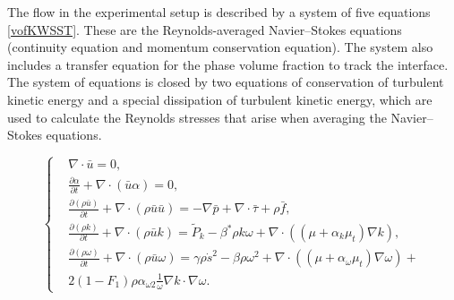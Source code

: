 \documentclass[mathematics,article,accept,pdftex,moreauthors]{Definitions/mdpi}
\begin{document}
The flow in the experimental setup is described by a system of five equations \eqref{vofKWSST}. These are the Reynolds-averaged Navier--Stokes equations (continuity equation and momentum conservation equation). The system also includes a transfer equation for the phase volume fraction to track the interface. The system of equations is closed by two equations of conservation of turbulent kinetic energy and a special dissipation of turbulent kinetic energy, which are used to calculate the Reynolds stresses that arise when averaging the Navier--Stokes equations.
\begin{linenomath} 
\begin{equation}
	\label{vofKWSST}
	\left\{
		\begin{aligned}
			&{\nabla} \cdot \bar{{u}} = 0,\\
			&\frac{\partial \alpha}{\partial t} + {\nabla} \cdot (\bar{{u}} \alpha) = 0,\\
			&\frac{\partial (\rho \bar{{u}})}{\partial t} + {\nabla} \cdot (\rho \bar{{u}} \bar{{u}}) = -{\nabla} \bar{p} + {\nabla} \cdot \bar{{\tau}} + \rho \bar{{f}},\\
			&\frac{\partial (\rho k)}{\partial t} + {\nabla} \cdot (\rho \bar{{u}} k) = \widetilde{P}_k - \beta^*\rho k \omega + {\nabla} \cdot \left( (\mu + \alpha_k \mu_t) {\nabla} k \right),\\
			&\frac{\partial (\rho \omega)}{\partial t}  + {\nabla} \cdot ( \rho \bar{{u}} \omega) = \gamma \rho \dot{s}^2 - \beta \rho \omega^2 + {\nabla} \cdot \left( (\mu + \alpha_\omega \mu_t) {\nabla} \omega \right) + \\
			&2 (1 - F_1) \rho \alpha_{\omega 2} \frac{1}{\omega} {\nabla} k \cdot {\nabla} \omega.
		\end{aligned}
	\right.
\end{equation}
\end{linenomath}
\end{document}
